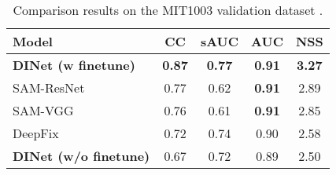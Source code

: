 \begin{table}[]
\centering
	\caption{Comparison results on the MIT1003 validation dataset \cite{judd2009learning}. }
	\label{MIT10031}
	\begin{tabular}{|l|c c c c|}
		\hline
		Model               & CC   & sAUC & AUC  & NSS   \\ \hline \hline
		\textbf{DINet (w finetune)}   & \textbf{0.87} & \textbf{0.77} & \textbf{0.91} & \textbf{3.27} \\ \hline
		SAM-ResNet  \cite{cornia2016predicting}               & 0.77 & 0.62 & \textbf{0.91} & 2.89   \\ \hline
		SAM-VGG     \cite{cornia2016predicting}           & 0.76 & 0.61 & \textbf{0.91} & 2.85   \\ \hline		
		DeepFix     \cite{kruthiventi2017deepfix}        & 0.72 & 0.74 & 0.90  & 2.58  \\ \hline	\hline	
		\textbf{DINet (w/o finetune)} & 0.67 & 0.72 & 0.89 & 2.50  \\ \hline
	\end{tabular}
	\vspace{-4mm}
\end{table}

